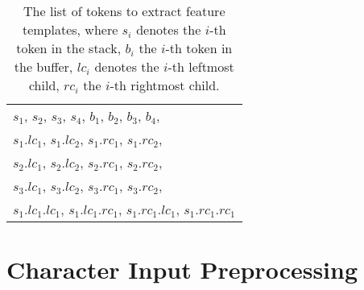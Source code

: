 \documentclass[11pt,a4paper]{article}
\begin{document}
    \begin{table}[h!]
    \begin{tabular}{ l }
    \hline
    $s_1$, $s_2$, $s_3$, $s_4$, $b_1$, $b_2$, $b_3$, $b_4$, \\
    $s_1.lc_1$, $s_1.lc_2$, $s_1.rc_1$, $s_1.rc_2$, \\
    $s_2.lc_1$, $s_2.lc_2$, $s_2.rc_1$, $s_2.rc_2$, \\
    $s_3.lc_1$, $s_3.lc_2$, $s_3.rc_1$, $s_3.rc_2$, \\
    $s_1.lc_1.lc_1$, $s_1.lc_1.rc_1$, $s_1.rc_1.lc_1$, $s_1.rc_1.rc_1$\\
    \hline
    \end{tabular}
    \caption{The list of tokens to extract feature templates, where $s_i$ denotes the $i$-th token in the stack, $b_i$ the $i$-th token in the buffer, $lc_i$ denotes the $i$-th leftmost child, $rc_i$ the $i$-th rightmost child.}\label{tab:feat}
    \end{table}

\section{Character Input Preprocessing}\label{sec:preprocess}


\end{document}
